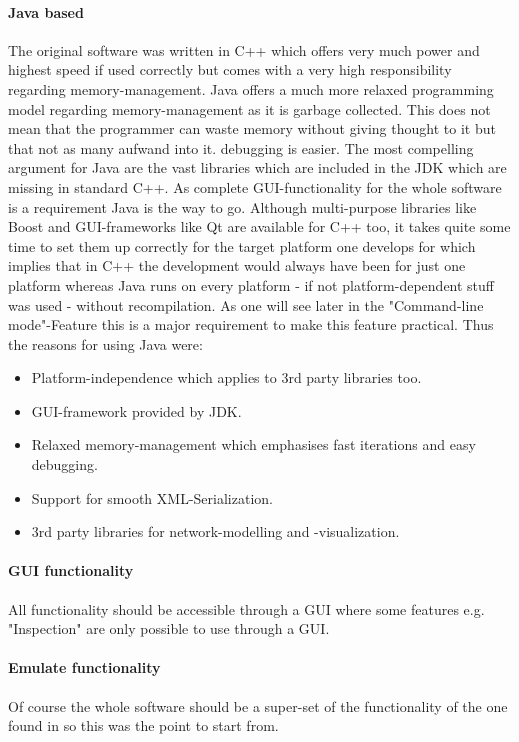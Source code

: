 \documentclass[Bachelorarbeit.tex]{subfiles}
\begin{document}
\paragraph{Java based}
The original software was written in C++ which offers very much power and highest speed if used correctly but comes with a very high responsibility regarding memory-management. Java offers a much more relaxed programming model regarding memory-management as it is garbage collected. This does not mean that the programmer can waste memory without giving thought to it but that not as many aufwand into it. debugging is easier.
The most compelling argument for Java are the vast libraries which are included in the JDK which are missing in standard C++. As complete GUI-functionality for the whole software is a requirement Java is the way to go. Although multi-purpose libraries like Boost and GUI-frameworks like Qt are available for C++ too, it takes quite some time to set them up correctly for the target platform one develops for which implies that in C++ the development would always have been for just one platform whereas Java runs on every platform - if not platform-dependent stuff was used - without recompilation. As one will see later in the "Command-line mode"-Feature this is a major requirement to make this feature practical. Thus the reasons for using Java were:

\begin{itemize}
\item Platform-independence which applies to 3rd party libraries too.
\item GUI-framework provided by JDK.
\item Relaxed memory-management which emphasises fast iterations and easy debugging.
\item Support for smooth XML-Serialization.
\item 3rd party libraries for network-modelling and -visualization.
\end{itemize}

\paragraph{GUI functionality}
All functionality should be accessible through a GUI where some features e.g. "Inspection" are only possible to use through a GUI.

\paragraph{Emulate \cite{Breuer2015} functionality}
Of course the whole software should be a super-set of the functionality of the one found in \cite{Breuer2015} so this was the point to start from.
\end{document}
